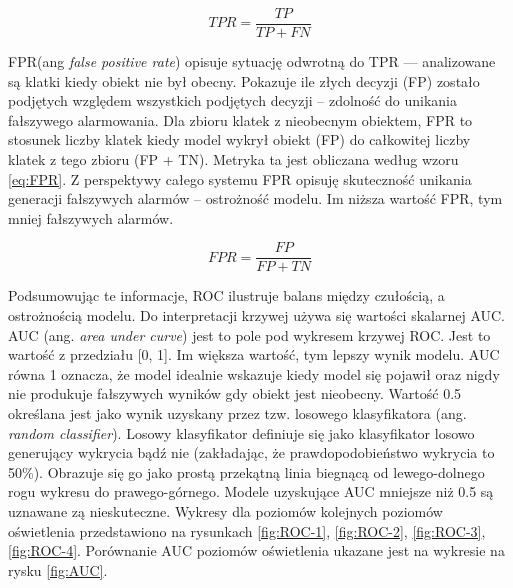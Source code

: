 \begin{equation}
    TPR = \frac{TP}{TP + FN}
    \label{eq:TPR}
\end{equation}

FPR(ang \emph{false positive rate}) opisuje sytuację odwrotną do TPR --- analizowane są klatki kiedy obiekt nie był obecny. Pokazuje ile złych decyzji (FP) zostało podjętych względem wszystkich podjętych decyzji -- zdolność do unikania fałszywego alarmowania. Dla zbioru klatek z nieobecnym obiektem, FPR to stosunek liczby klatek kiedy model wykrył obiekt (FP) do całkowitej liczby klatek z tego zbioru (FP + TN). Metryka ta jest obliczana według wzoru \ref{eq:FPR}. Z perspektywy całego systemu FPR opisuję skuteczność unikania generacji fałszywych alarmów -- ostrożność modelu. Im niższa wartość FPR, tym mniej fałszywych alarmów.


\begin{equation}
    FPR = \frac{FP}{FP + TN}
    \label{eq:FPR}
\end{equation}

Podsumowując te informacje, ROC ilustruje balans między czułością, a ostrożnością modelu. Do interpretacji krzywej używa się wartości skalarnej AUC. AUC (ang. \emph{area under curve}) jest to pole pod wykresem krzywej ROC. Jest to wartość z przedziału [0, 1]. Im większa wartość, tym lepszy wynik modelu. AUC równa 1 oznacza, że model idealnie wskazuje kiedy model się pojawił oraz nigdy nie produkuje fałszywych wyników gdy obiekt jest nieobecny. Wartość 0.5 określana jest jako wynik uzyskany przez tzw. losowego klasyfikatora (ang. \emph{random classifier}). Losowy klasyfikator definiuje się jako klasyfikator losowo generujący wykrycia bądź nie (zakładając, że prawdopodobieństwo wykrycia to 50\%). Obrazuje się go jako prostą przekątną linia biegnącą od lewego-dolnego rogu wykresu do prawego-górnego. Modele uzyskujące AUC mniejsze niż 0.5 są uznawane zą nieskuteczne. 
Wykresy dla poziomów kolejnych poziomów oświetlenia przedstawiono na rysunkach \ref{fig:ROC-1}, \ref{fig:ROC-2}, \ref{fig:ROC-3}, \ref{fig:ROC-4}. Porównanie AUC poziomów oświetlenia ukazane jest na wykresie na rysku \ref{fig:AUC}.



